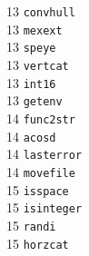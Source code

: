 \begin{footnotesize}
\begin{multicols}{3}
\vspace{-.153cm} 13    \hspace{.2cm} {\tt convhull            }    \\ %
\vspace{-.153cm} 13    \hspace{.2cm} {\tt mexext              }    \\ %
\vspace{-.153cm} 13    \hspace{.2cm} {\tt speye               }    \\ %
\vspace{-.153cm} 13    \hspace{.2cm} {\tt vertcat             }    \\ %
\vspace{-.153cm} 13    \hspace{.2cm} {\tt int16               }    \\ %
\vspace{-.153cm} 13    \hspace{.2cm} {\tt getenv              }    \\ %
\vspace{-.153cm} 14    \hspace{.2cm} {\tt func2str            }    \\ %
\vspace{-.153cm} 14    \hspace{.2cm} {\tt acosd               }    \\ %
\vspace{-.153cm} 14    \hspace{.2cm} {\tt lasterror           }    \\ %
\vspace{-.153cm} 14    \hspace{.2cm} {\tt movefile            }    \\ %
\vspace{-.153cm} 15    \hspace{.2cm} {\tt isspace             }    \\ %
\vspace{-.153cm} 15    \hspace{.2cm} {\tt isinteger           }    \\ %
\vspace{-.153cm} 15    \hspace{.2cm} {\tt randi               }    \\ %
\vspace{-.153cm} 15    \hspace{.2cm} {\tt horzcat             }    \\ %

\end{multicols}
\end{footnotesize}
